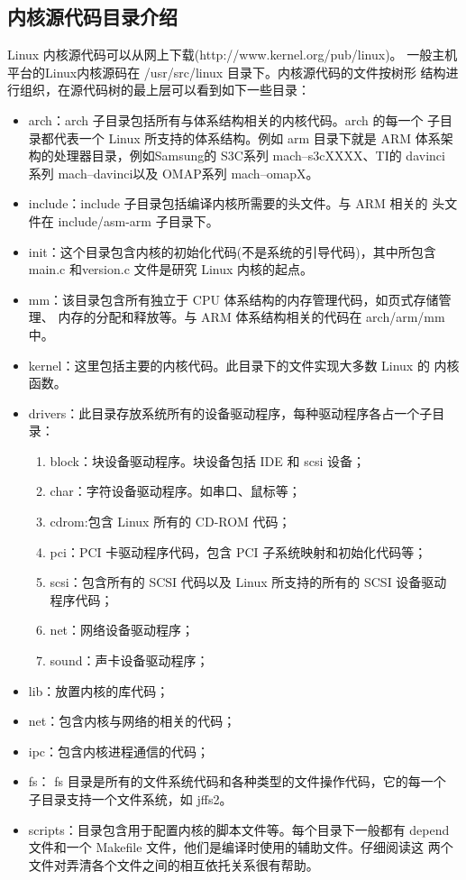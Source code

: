 \subsection{内核源代码目录介绍}
	Linux 内核源代码可以从网上下载(http://www.kernel.org/pub/linux)。
一般主机平台的Linux内核源码在 /usr/src/linux 目录下。内核源代码的文件按树形
结构进行组织，在源代码树的最上层可以看到如下一些目录：
\begin{itemize}
  \item arch：arch 子目录包括所有与体系结构相关的内核代码。arch 的每一个
		子目录都代表一个 Linux 所支持的体系结构。例如 arm 目录下就是 ARM
		体系架构的处理器目录，例如Samsung的 S3C系列 mach--s3cXXXX、TI的
		davinci 系列 mach--davinci以及 OMAP系列 mach--omapX。
  \item include：include 子目录包括编译内核所需要的头文件。与 ARM 相关的
		头文件在 include/asm-arm 子目录下。
  \item init：这个目录包含内核的初始化代码(不是系统的引导代码)，其中所包含
		main.c 和version.c 文件是研究 Linux 内核的起点。
  \item mm：该目录包含所有独立于 CPU 体系结构的内存管理代码，如页式存储管理、
		内存的分配和释放等。与 ARM 体系结构相关的代码在 arch/arm/mm 中。
  \item kernel：这里包括主要的内核代码。此目录下的文件实现大多数 Linux 的
		内核函数。
  \item drivers：此目录存放系统所有的设备驱动程序，每种驱动程序各占一个子目录：
  \begin{enumerate}
  \item block：块设备驱动程序。块设备包括 IDE 和 scsi 设备；
  \item char：字符设备驱动程序。如串口、鼠标等；
  \item cdrom:包含 Linux 所有的 CD-ROM 代码；
  \item pci：PCI 卡驱动程序代码，包含 PCI 子系统映射和初始化代码等；
  \item scsi：包含所有的 SCSI 代码以及 Linux 所支持的所有的 SCSI 设备驱动
		程序代码；
  \item net：网络设备驱动程序；
  \item sound：声卡设备驱动程序；
  \end{enumerate}
  \item lib：放置内核的库代码；
  \item net：包含内核与网络的相关的代码；
  \item ipc：包含内核进程通信的代码；
  \item fs： fs 目录是所有的文件系统代码和各种类型的文件操作代码，它的每一个
		子目录支持一个文件系统，如 jffs2。
  \item scripts：目录包含用于配置内核的脚本文件等。每个目录下一般都有 depend
		文件和一个 Makefile 文件，他们是编译时使用的辅助文件。仔细阅读这
		两个文件对弄清各个文件之间的相互依托关系很有帮助。
\end{itemize}

